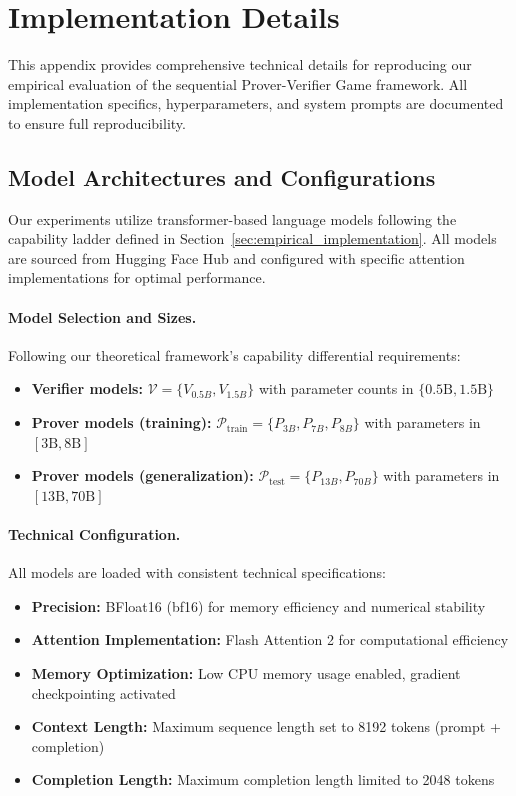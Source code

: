 \label{app:C}
\section{Implementation Details}

This appendix provides comprehensive technical details for reproducing our empirical evaluation of the sequential Prover-Verifier Game framework. All implementation specifics, hyperparameters, and system prompts are documented to ensure full reproducibility.

\subsection{Model Architectures and Configurations}
\label{sec:model_configs}

Our experiments utilize transformer-based language models following the capability ladder defined in Section~\ref{sec:empirical_implementation}. All models are sourced from Hugging Face Hub and configured with specific attention implementations for optimal performance.

\paragraph{Model Selection and Sizes.} Following our theoretical framework's capability differential requirements:
\begin{itemize}
    \item \textbf{Verifier models:} $\mathcal{V} = \{V_{0.5B}, V_{1.5B}\}$ with parameter counts in $\{0.5\text{B}, 1.5\text{B}\}$
    \item \textbf{Prover models (training):} $\mathcal{P}_{\text{train}} = \{P_{3B}, P_{7B}, P_{8B}\}$ with parameters in $[3\text{B}, 8\text{B}]$
    \item \textbf{Prover models (generalization):} $\mathcal{P}_{\text{test}} = \{P_{13B}, P_{70B}\}$ with parameters in $[13\text{B}, 70\text{B}]$
\end{itemize}

\paragraph{Technical Configuration.} All models are loaded with consistent technical specifications:
\begin{itemize}
    \item \textbf{Precision:} BFloat16 (bf16) for memory efficiency and numerical stability
    \item \textbf{Attention Implementation:} Flash Attention 2 \citep{dao2023flashattention2} for computational efficiency
    \item \textbf{Memory Optimization:} Low CPU memory usage enabled, gradient checkpointing activated
    \item \textbf{Context Length:} Maximum sequence length set to 8192 tokens (prompt + completion)
    \item \textbf{Completion Length:} Maximum completion length limited to 2048 tokens
\end{itemize}

